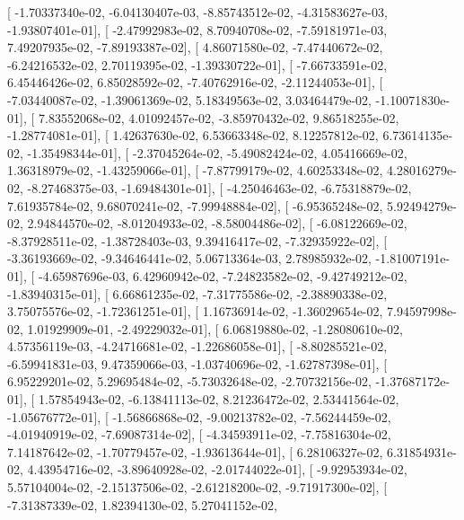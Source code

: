 \documentclass{article}
\begin{document}
       [ -1.70337340e-02,  -6.04130407e-03,  -8.85743512e-02,
         -4.31583627e-03,  -1.93807401e-01],
       [ -2.47992983e-02,   8.70940708e-02,  -7.59181971e-03,
          7.49207935e-02,  -7.89193387e-02],
       [  4.86071580e-02,  -7.47440672e-02,  -6.24216532e-02,
          2.70119395e-02,  -1.39330722e-01],
       [ -7.66733591e-02,   6.45446426e-02,   6.85028592e-02,
         -7.40762916e-02,  -2.11244053e-01],
       [ -7.03440087e-02,  -1.39061369e-02,   5.18349563e-02,
          3.03464479e-02,  -1.10071830e-01],
       [  7.83552068e-02,   4.01092457e-02,  -3.85970432e-02,
          9.86518255e-02,  -1.28774081e-01],
       [  1.42637630e-02,   6.53663348e-02,   8.12257812e-02,
          6.73614135e-02,  -1.35498344e-01],
       [ -2.37045264e-02,  -5.49082424e-02,   4.05416669e-02,
          1.36318979e-02,  -1.43259066e-01],
       [ -7.87799179e-02,   4.60253348e-02,   4.28016279e-02,
         -8.27468375e-03,  -1.69484301e-01],
       [ -4.25046463e-02,  -6.75318879e-02,   7.61935784e-02,
          9.68070241e-02,  -7.99948884e-02],
       [ -6.95365248e-02,   5.92494279e-02,   2.94844570e-02,
         -8.01204933e-02,  -8.58004486e-02],
       [ -6.08122669e-02,  -8.37928511e-02,  -1.38728403e-03,
          9.39416417e-02,  -7.32935922e-02],
       [ -3.36193669e-02,  -9.34646441e-02,   5.06713364e-03,
          2.78985932e-02,  -1.81007191e-01],
       [ -4.65987696e-03,   6.42960942e-02,  -7.24823582e-02,
         -9.42749212e-02,  -1.83940315e-01],
       [  6.66861235e-02,  -7.31775586e-02,  -2.38890338e-02,
          3.75075576e-02,  -1.72361251e-01],
       [  1.16736914e-02,  -1.36029654e-02,   7.94597998e-02,
          1.01929909e-01,  -2.49229032e-01],
       [  6.06819880e-02,  -1.28080610e-02,   4.57356119e-03,
         -4.24716681e-02,  -1.22686058e-01],
       [ -8.80285521e-02,  -6.59941831e-03,   9.47359066e-03,
         -1.03740696e-02,  -1.62787398e-01],
       [  6.95229201e-02,   5.29695484e-02,  -5.73032648e-02,
         -2.70732156e-02,  -1.37687172e-01],
       [  1.57854943e-02,  -6.13841113e-02,   8.21236472e-02,
          2.53441564e-02,  -1.05676772e-01],
       [ -1.56866868e-02,  -9.00213782e-02,  -7.56244459e-02,
         -4.01940919e-02,  -7.69087314e-02],
       [ -4.34593911e-02,  -7.75816304e-02,   7.14187642e-02,
         -1.70779457e-02,  -1.93613644e-01],
       [  6.28106327e-02,   6.31854931e-02,   4.43954716e-02,
         -3.89640928e-02,  -2.01744022e-01],
       [ -9.92953934e-02,   5.57104004e-02,  -2.15137506e-02,
         -2.61218200e-02,  -9.71917300e-02],
       [ -7.31387339e-02,   1.82394130e-02,   5.27041152e-02,
\end{document}
